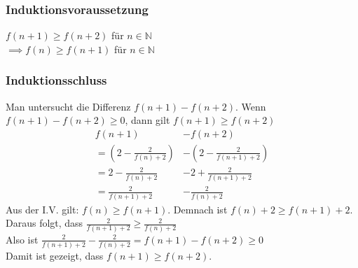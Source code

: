 \documentclass{article}
\begin{document}
\subsubsection{Induktionsvoraussetzung}
$f(n + 1) \geq f(n + 2)$ für $n \in \mathbb{N}$ \\
$\implies f(n) \geq f(n + 1)$ für $n \in \mathbb{N}$

\subsubsection{Induktionsschluss}
Man untersucht die Differenz $f(n + 1) - f(n + 2)$. Wenn $f(n + 1) - f(n + 2) \geq 0$, dann gilt $f(n + 1) \geq f(n + 2)$
\begin{align*}
    f(n + 1) &- f(n + 2) \\
    = \left(2 - \frac{2}{f(n) + 2}\right) &- \left(2 - \frac{2}{f(n + 1) + 2}\right) \\
    = 2 - \frac{2}{f(n)+2} &- 2 + \frac{2}{f(n+1) + 2} \\
    = \frac{2}{f(n+1) + 2} &- \frac{2}{f(n) + 2}
\end{align*}
Aus der I.V. gilt: $f(n) \geq f(n + 1)$. Demnach ist $f(n) + 2 \geq f(n + 1) + 2$. \\
Daraus folgt, dass $\frac{2}{f(n+1) + 2} \geq \frac{2}{f(n) + 2}$ \\
Also ist $\frac{2}{f(n+1)+2} - \frac{2}{f(n)+2} = f(n + 1) - f(n + 2) \geq 0$ \\
Damit ist gezeigt, dass $f(n + 1) \geq f(n + 2)$.
\end{document}
